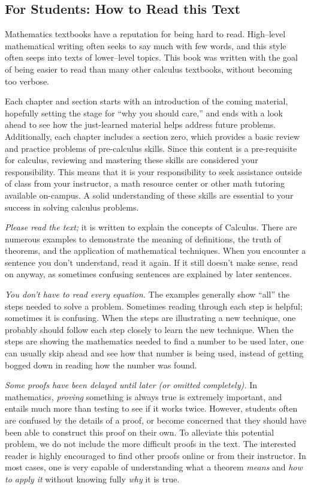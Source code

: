 \subsection{For Students: How to Read this Text}

Mathematics textbooks have a reputation for being hard to read. High--level mathematical writing often seeks to say much with few words, and this style often seeps into texts of lower--level topics. This book was written with the goal of being easier to read than many other calculus textbooks, without becoming too verbose. 

Each chapter and section starts with an introduction of the coming material, hopefully setting the stage for ``why you should care,'' and ends with a look ahead to see how the just-learned material helps address future problems. Additionally, each chapter includes a section zero, which provides a basic review and practice problems of pre-calculus skills. Since this content is a pre-requisite for calculus, reviewing and mastering these skills are considered your responsibility. This means that it is your responsibility to seek assistance outside of class from your instructor, a math resource center or other math tutoring available on-campus.  A solid understanding of these skills are essential to your success in solving calculus problems.

\textit{Please read the text;} it is written to explain the concepts of Calculus. There are numerous examples to demonstrate the meaning of definitions, the truth of theorems, and the application of mathematical techniques. When you encounter a sentence you don't understand, read it again. If it still doesn't make sense, read on anyway, as sometimes confusing sentences are explained by later sentences.

\textit{You don't have to read every equation.} The examples generally show ``all'' the steps needed to solve a problem. Sometimes reading through each step is helpful; sometimes it is confusing. When the steps are illustrating a new technique, one probably should follow each step closely to learn the new technique. When the steps are showing the mathematics needed to find a number to be used later, one can usually skip ahead and see how that number is being used, instead of getting bogged down in reading how the number was found.

\textit{Some proofs have been delayed until later (or omitted completely).} In mathematics, \textit{proving} something is always true is extremely important, and entails much more than testing to see if it works twice. However, students often are confused by the details of a proof, or become concerned that they should have been able to construct this proof on their own. To alleviate this potential problem, we do not include the more difficult proofs in the text.
The interested reader is highly encouraged to find other proofs online or from their instructor. In most cases, one is very capable of understanding what a theorem \textit{means} and \textit{how to apply it} without knowing fully \textit{why} it is true.

